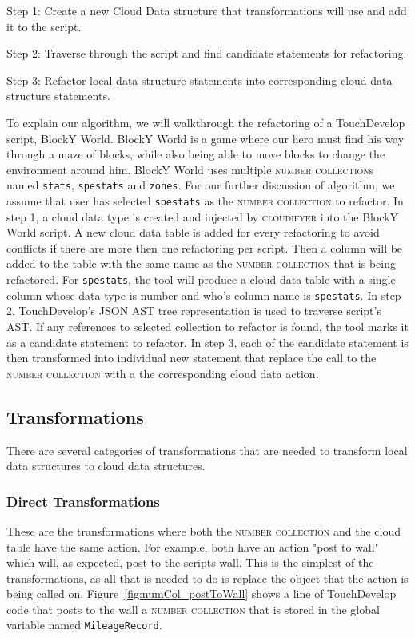 \documentclass{sigplanconf}
\begin{document}
Step 1: Create a new Cloud Data structure that transformations will use and add it to the script.

Step 2: Traverse through the script and find candidate statements for refactoring.

Step 3: Refactor local data structure statements into corresponding cloud data structure statements.

To explain our algorithm, we will walkthrough the refactoring of a TouchDevelop script, BlockY World.  BlockY World is a game where our hero must find his way through a maze of blocks, while also being able to move blocks to change the environment around him.  BlockY World uses multiple \textsc{number collection}s named \texttt{stats}, \texttt{spestats} and \texttt{zones}. For our further discussion of algorithm, we assume that user has selected \texttt{spestats} as the \textsc{number collection} to refactor. In step 1, a cloud data type is created and injected by \textsc{cloudifyer} into the BlockY World script.  A new cloud data table is added for every refactoring to avoid conflicts if there are more then one refactoring per script. Then a column will be added to the table with the same name as the \textsc{number collection} that is being refactored.  For \texttt{spestats}, the tool will produce a cloud data table with a single column whose data type is number and who's column name is \texttt{spestats}.  In step 2, TouchDevelop's JSON AST tree representation is used to traverse script's AST. If any references to selected collection to refactor is found, the tool marks it as a candidate statement to refactor.  In step 3, each of the candidate statement is then transformed into individual new statement that replace the call to the \textsc{number collection} with a the corresponding cloud data action. 

\subsection{Transformations}
There are several categories of transformations that are needed to transform local data structures to cloud data structures.  


\subsubsection{Direct Transformations}
These are the transformations where both the \textsc{number collection} and the cloud table have the same action.  For example, both have an action "post to wall" which will, as expected, post to the scripts wall.  This is the simplest of the transformations, as all that is needed to do is replace the object that the action is being called on.  Figure~\ref{fig:numCol_postToWall} shows a line of TouchDevelop code that posts to the wall a \textsc{number collection} that is stored in the global variable named \texttt{MileageRecord}.
\end{document}
